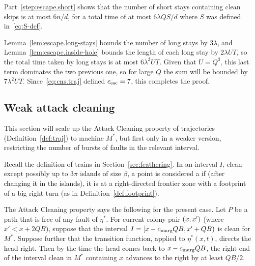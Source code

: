 \documentclass[11pt]{memoir}
\theoremstyle{definition} %
\def\B{B}
\def\U{U}
\renewcommand{\d}{d}
\newcommand{\passno}{\pi}
\newcommand{\Q}{Q} %
\renewcommand{\S}{S} %
\newcommand{\Tu}{T}
\newcommand{\cns}[1]{c_{\textrm{\upshape #1}}}
\newcommand{\CEsc}{\cns{esc}}
\newcommand{\CMarg}{\cns{marg}}
\begin{document}
\begin{Proof}
\begin{prooof}
  Part~\ref{step:escape.short} shows that the number of short stays containing clean
  skips is at most \( 6 n/\d \), for a total time of at most \( 6 \lambda\Q\S/\d \)
  where \( \S \) was defined in~\eqref{eq:S-def}.

  Lemma~\ref{lem:escape.long-stays} bounds the number of long stays by \( 3\lambda \),
  and Lemma~\ref{lem:escape.inside-hole} bounds the length
  of each long stay by \( 2 \lambda\U\Tu \), so the total time taken by long stays is
  at most \( 6\lambda^{2}\U\Tu \).
  Given that \( U=\Q^{3} \), this last term dominates the two previous one,
  so for large \( \Q \) the sum will be bounded by \( 7\lambda^{2}\U\Tu \).
  Since~\eqref{eq:cns.traj} defined \( \CEsc=7 \), this completes the proof.
\end{prooof} %
\end{Proof}


\subsection{Weak attack cleaning}

This section will scale up the Attack Cleaning
property of trajectories (Definition~\ref{def:traj})
to machine \( M^{*} \), but first only in 
a weaker version, restricting the number of bursts of faults in the relevant interval.

\begin{definition}[Trap]\label{def:trap}
  Recall the definition of trains in Section~\ref{sec:feathering}.
In an interval \( I \), clean except possibly up to \( 3\passno \) islands of size \( \beta \),
a point is considered a  if (after changing it in the islands),
it is at a right-directed frontier zone with a footprint of a big right turn (as in Definition~\ref{def:footprint}).
\end{definition}

The Attack Cleaning property says the following for the present case.
Let \( P \) be a path that is free of any fault of \( \eta^{*} \).
For current colony-pair \( (x,x') \) (where \( x'< x+2\Q\B \)), suppose that the interval
\( I=\lint{x-\CMarg\Q\B}{x'+\Q\B} \) is clean for \( M^{*} \).
Suppose further that the transition function, applied to \( \eta^{*}(x,t) \), directs the head right.
Then by the time the head comes back to \( x-\CMarg\Q\B \),
the right end of the interval clean in \( M^{*} \)
containing \( x \) advances to the right by at least \( \Q\B /2\).
\end{document}
